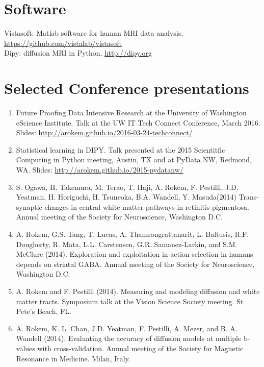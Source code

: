 \documentclass[11pt,fullpage]{article}
\newcommand{\years}[1]{\marginnote{\scriptsize #1}} %
\begin{document}
\section*{Software}

\years{2011 -- 2015} Vistasoft: Matlab software for human MRI data analysis, \url{https://github.com/vistalab/vistasoft}\\
\years{2011 - } Dipy: diffusion MRI in Python, \url{http://dipy.org}\\



\section*{Selected Conference presentations}
\begin{enumerate}

\item Future Proofing Data Intensive Research at the University of Washington eScience Institute. Talk at the UW IT Tech Connect Conference, March 2016. Slides: \url{http://arokem.github.io/2016-03-24-techconnect/}

\item Statistical learning in DIPY. Talk presented at the 2015 Scientitfic Computing in Python meeting, Austin, TX and at PyData NW, Redmond, WA. Slides: \url{http://arokem.github.io/2015-pydatanw/}

\item S. Ogawa, H. Takemura, M. Terao, T. Haji, A. Rokem, F. Pestilli, J.D. Yeatman, H. Horiguchi, H. Tsuneoka, B.A. Wandell, Y. Masuda(2014) Trans-synaptic changes in central white matter pathways in retinitis pigmentosa. Annual meeting of the Society for Neuroscience, Washington D.C.

\item A. Rokem, G.S. Tang, T. Lucas, A. Thamrongrattanarit, L. Baltusis, R.F. Dougherty, R. Mata, L.L. Carstensen, G.R. Samanez-Larkin, and S.M. McClure (2014). Exploration and exploitation in action selection in humans depends on striatal GABA. Annual meeting of the Society for Neuroscience, Washington D.C.

\item A. Rokem and F. Pestilli (2014). Measuring and modeling diffusion and white matter tracts. Symposium talk at the Vision Science Society meeting. St Pete's Beach, FL.

\item A. Rokem, K. L. Chan, J.D. Yeatman, F. Pestilli, A. Mezer, and B. A. Wandell (2014). Evaluating the accuracy of diffusion models at multiple b-values with cross-validation. Annual meeting of the Society for Magnetic Resonance in Medicine. Milan, Italy.


\end{enumerate}
\end{document}
